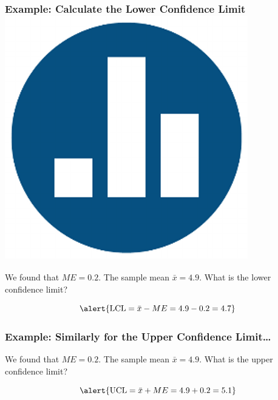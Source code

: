 \documentclass[handout]{beamer}
\begin{document}
\begin{frame}
\frametitle{Example: Calculate the Lower Confidence Limit \hfill \includegraphics[scale = 0.05]{./images/clicker}}


\begin{center}
\end{center}

We found that $ME=0.2$. The sample mean $\bar{x} = 4.9$. What is the lower confidence limit?
\pause

\vspace{2em}

	$$\alert{\mbox{LCL} = \bar{x} - ME= 4.9 - 0.2 = 4.7}$$

\end{frame}
\begin{frame}
  \frametitle{Example: Similarly for the Upper Confidence Limit\dots}


\begin{center}
\end{center}

We found that $ME=0.2$. The sample mean $\bar{x} = 4.9$. What is the upper confidence limit?
\pause

\vspace{2em}

	$$\alert{\mbox{UCL} = \bar{x} + ME= 4.9 + 0.2 = 5.1}$$

\end{frame}
\end{document}
